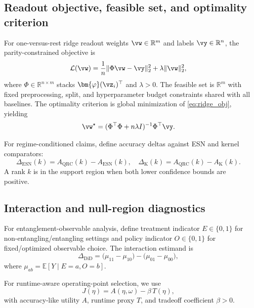 \documentclass{article} %
\begin{document}
\subsection{Readout objective, feasible set, and optimality criterion}
For one-versus-rest ridge readout weights $\vw\in\mathbb{R}^{m}$ and labels $\vy\in\mathbb{R}^{n}$, the parity-constrained objective is
\begin{equation}
\mathcal{L}(\vw)=\frac{1}{n}\|\Phi\vw-\vy\|_2^2+\lambda\|\vw\|_2^2,
\label{eq:ridge_obj}
\end{equation}
where $\Phi\in\mathbb{R}^{n\times m}$ stacks $\bm{\varphi}(\vz_i)^\top$ and $\lambda>0$. The feasible set is $\mathbb{R}^{m}$ with fixed preprocessing, split, and hyperparameter budget constraints shared with all baselines. The optimality criterion is global minimization of \eqref{eq:ridge_obj}, yielding
\begin{equation}
\vw^\star=(\Phi^\top\Phi+n\lambda I)^{-1}\Phi^\top\vy.
\label{eq:ridge_solution}
\end{equation}

For regime-conditioned claims, define accuracy deltas against ESN and kernel comparators:
\begin{equation}
\Delta_{\text{ESN}}(k)=A_{\text{QRC}}(k)-A_{\text{ESN}}(k),\quad
\Delta_{\text{K}}(k)=A_{\text{QRC}}(k)-A_{\text{K}}(k).
\label{eq:deltas}
\end{equation}
A rank $k$ is in the support region when both lower confidence bounds are positive.

\subsection{Interaction and null-region diagnostics}
For entanglement-observable analysis, define treatment indicator $E\in\{0,1\}$ for non-entangling/entangling settings and policy indicator $O\in\{0,1\}$ for fixed/optimized observable choice. The interaction estimand is
\begin{equation}
\Delta_{\mathrm{DiD}}=\big(\mu_{11}-\mu_{10}\big)-\big(\mu_{01}-\mu_{00}\big),
\label{eq:did}
\end{equation}
where $\mu_{ab}=\mathbb{E}[Y\mid E=a,O=b]$.

For runtime-aware operating-point selection, we use
\begin{equation}
J(\eta)=A(\eta,\omega)-\beta\,T(\eta),
\label{eq:utility}
\end{equation}
with accuracy-like utility $A$, runtime proxy $T$, and tradeoff coefficient $\beta>0$.
\end{document}
